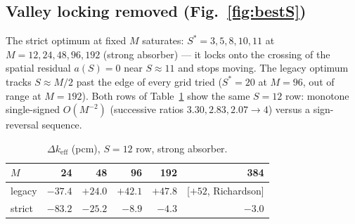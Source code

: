 \documentclass[11pt,a4paper]{article}
\begin{document}
\subsection{Valley locking removed (Fig.~\ref{fig:bestS})}
The strict optimum at fixed $M$ saturates:
$S^{*}=3,5,8,10,11$ at $M=12,24,48,96,192$ (strong absorber) --- it
locks onto the crossing of the spatial residual $a(S)=0$ near
$S\approx11$ and stops moving.  The legacy optimum tracks
$S\approx M/2$ past the edge of every grid tried
($S^{*}=20$ at $M{=}96$, out of range at $M{=}192$).  Both rows of
Table~\ref{tab:rows} show the same $S{=}12$ row: monotone single-signed
$O(M^{-2})$ (successive ratios $3.30,2.83,2.07\to4$) versus a
sign-reversal sequence.

\begin{table}[t]
\centering
\caption{$\Delta k_{\mathrm{eff}}$ (pcm), $S{=}12$ row, strong absorber.}
\label{tab:rows}
\begin{tabular}{lrrrrr}
\toprule
$M$ & 24 & 48 & 96 & 192 & 384 \\
\midrule
legacy & $-37.4$ & $+24.0$ & $+42.1$ & $+47.8$ & [$+52$, Richardson] \\
strict & $-83.2$ & $-25.2$ & $-8.9$  & $-4.3$  & $-3.0$ \\
\bottomrule
\end{tabular}
\end{table}
\end{document}
